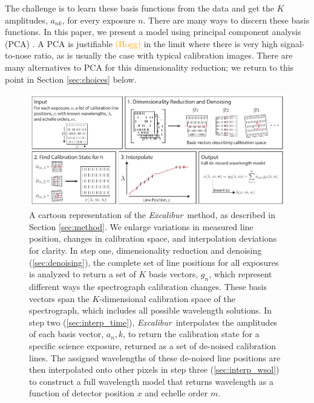 \documentclass[modern]{aastex63}
\newcommand{\project}[1]{\textsl{#1}}
\newcommand{\name}{\project{Excalibur}}
\newcommand{\lz}[1]{\textcolor{orange}{#1}}
\begin{document}
The challenge is to learn these basis functions from the data and get the $K$ amplitudes, $a_{nk}$, for every exposure $n$.  There are many ways to discern these basis functions.  In this paper, we present a model using principal component analysis (PCA) \citep{wiki_pca}.  A PCA is justifiable \lz{(Hogg)} in the limit where there is very high signal-to-nose ratio, as is usually the case with typical calibration images.  There are many alternatives to PCA for this dimensionality reduction; we return to this point in Section \ref{sec:choices} below.

\begin{figure}[t]
\centering
\includegraphics[width=\textwidth]{Figures/methodCartoon.pdf}
\caption{A cartoon representation of the \name\ method, as described in Section \ref{sec:method}.  We enlarge variations in measured line position, changes in calibration space, and interpolation deviations for clarity.  In step one, dimensionality reduction and denoising (\textsection \ref{sec:denoising}), the complete set of line positions for all exposures is analyzed to return a set of $K$ basis vectors, $g_n$, which represent different ways the spectrograph calibration changes.  These basis vectors span the $K$-dimensional calibration space of the spectrograph, which includes all possible wavelength solutions.  In step two (\textsection \ref{sec:interp_time}), \name\ interpolates the amplitudes of each basis vector, $a_n,k$, to return the calibration state for a specific science exposure, returned as a set of de-noised calibration lines.  The assigned wavelengths of these de-noised line positions are then interpolated onto other pixels in step three (\textsection \ref{sec:interp_wsol}) to construct a full wavelength model that returns wavelength as a function of detector position $x$ and echelle order $m$.}
\label{fig:cartoon}
\end{figure} 
\end{document}
